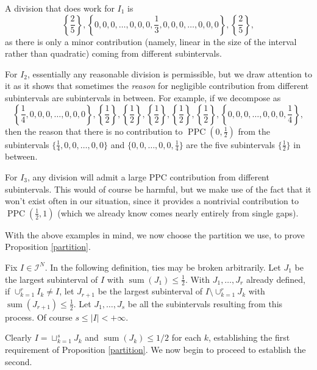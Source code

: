 \documentclass[12pt]{amsart}
\theoremstyle{definition}
\newcommand{\vs}{\vspace{3mm}}
\newcommand{\vsss}{\vspace{6mm}}
\newcommand{\mc}{\mathcal}
\DeclareMathOperator{\PPC}{PPC}
\DeclareMathOperator{\summ}{sum}
\begin{document}
{\vspace{1mm}

A division that does work for $I_1$ is $${\textstyle \left\{\frac{2}{5}\right\},\left\{0,0,0,\dots,0,0,0,\frac{1}{3},0,0,0,\dots,0,0,0\right\},\left\{\frac{2}{5}\right\},} $$ as there is only a minor contribution (namely, linear in the size of the interval rather than quadratic) coming from different subintervals. 

\vs

For $I_2$, essentially any reasonable division is permissible, but we draw attention to it as it shows that sometimes the \textit{reason} for negligible contribution from different subintervals are subintervals in between. For example, if we decompose as $${\textstyle \left\{\frac{1}{4},0,0,0,\dots,0,0,0\right\},\left\{\frac{1}{2}\right\},\left\{\frac{1}{2}\right\},\left\{\frac{1}{2}\right\},\left\{\frac{1}{2}\right\},\left\{\frac{1}{2}\right\},\left\{0,0,0,\dots,0,0,0,\frac{1}{4}\right\},}$$ then the reason that there is no contribution to $\PPC(0,\frac{1}{2})$ from the subintervals $\{\frac{1}{4},0,0,\dots,0,0\}$ and $\{0,0,\dots,0,0,\frac{1}{4}\}$ are the five subintervals $\{\frac{1}{2}\}$ in between. 

\vs

For $I_3$, any division will admit a large PPC contribution from different subintervals. This would of course be harmful, but we make use of the fact that it won't exist often in our situation, since it provides a nontrivial contribution to $\PPC(\frac{1}{2},1)$ (which we already know comes nearly entirely from single gaps).} 

\vsss

With the above examples in mind, we now choose the partition we use, to prove Proposition \ref{partition}. 

\vs

Fix $I \in \mc{I}^N$. In the following definition, ties may be broken arbitrarily. Let $J_1$ be the largest subinterval of $I$ with $\summ(J_1) \le \frac{1}{2}$. With $J_1,\dots,J_r$ already defined, if $\cup_{k=1}^r I_k \not = I$, let $J_{r+1}$ be the largest subinterval of $I\setminus\cup_{k=1}^r J_k$ with $\summ(J_{r+1}) \le \frac{1}{2}$. Let $J_1,\dots,J_s$ be all the subintervals resulting from this process. Of course $s \le |I| < +\infty$. 

\vs

Clearly $I = \sqcup_{k=1}^s J_k$ and $\summ(J_k) \leq 1/2$ for each $k$, establishing the first requirement of Proposition \ref{partition}. We now begin to proceed to establish the second.
\end{document}

